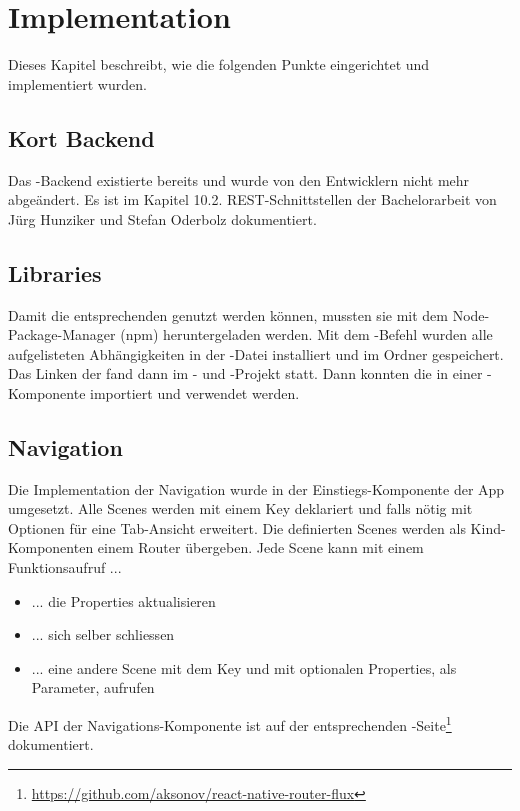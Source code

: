 \chapter{Implementation}
\label{pd-implementation}
Dieses Kapitel beschreibt, wie die folgenden Punkte eingerichtet und implementiert wurden. 


\section{Kort Backend}
Das \kort{}-Backend existierte bereits und wurde von den Entwicklern nicht mehr abgeändert. 
Es ist im Kapitel 10.2. \gls{REST}-Schnittstellen der Bachelorarbeit von Jürg Hunziker und Stefan Oderbolz dokumentiert.\cite{ba-kort-2012}


\section{Libraries}
Damit die entsprechenden  genutzt werden können, mussten sie mit dem Node-Package-Manager (npm) heruntergeladen werden. 
Mit dem -Befehl wurden alle aufgelisteten Abhängigkeiten in der  -Datei installiert und im Ordner \newline{} gespeichert.
Das Linken der  fand dann im - und -Projekt statt. 
Dann konnten die  in einer -Komponente importiert und verwendet werden. 


\section{Navigation}
Die Implementation der Navigation wurde in der Einstiegs-Komponente der App umgesetzt. 
Alle Scenes werden mit einem Key deklariert und falls nötig mit Optionen für eine Tab-Ansicht erweitert. 
Die definierten Scenes werden als Kind-Komponenten einem Router übergeben. 
Jede Scene kann mit einem Funktionsaufruf ...
\begin{itemize}
	\item ... die Properties aktualisieren
	\item ... sich selber schliessen
	\item ... eine andere Scene mit dem Key und mit optionalen Properties, als Parameter, aufrufen
\end{itemize} 
Die \gls{API} der Navigations-Komponente ist auf der entsprechenden -Seite\footnote{\url{https://github.com/aksonov/react-native-router-flux}} dokumentiert. 


